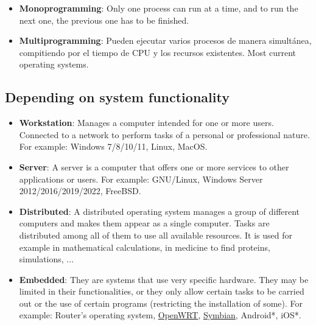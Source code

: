 \begin{itemize}
    \item \textbf{Monoprogramming}: Only one process can run at a time, and to run the next one, the previous one has to be finished. \hyperlink{1st_generation operating systems}{}

    \item \textbf{Multiprogramming}: Pueden ejecutar varios procesos de manera simultánea, compitiendo por el tiempo de CPU y los recursos existentes. Most current operating systems.
\end{itemize}


\subsection{Depending on system functionality}

\begin{itemize}
    \item \textbf{Workstation}: Manages a computer intended for one or more users. Connected to a network to perform tasks of a personal or professional nature. For example: Windows 7/8/10/11, Linux, MacOS.

    \item \textbf{Server}: A server is a computer that offers one or more services to other applications or users. For example: GNU/Linux, Windows Server 2012/2016/2019/2022, FreeBSD.

    \item \textbf{Distributed}: A distributed operating system manages a group of different computers and makes them appear as a single computer. Tasks are distributed among all of them to use all available resources. It is used for example in mathematical calculations, in medicine to find proteins, simulations, ...

    \item \textbf{Embedded}: They are systems that use very specific hardware. They may be limited in their functionalities, or they only allow certain tasks to be carried out or the use of certain programs (restricting the installation of some). For example: Router's operating system, \href{https://en.wikipedia.org/wiki/OpenWrt}{OpenWRT}, \href{https://en.wikipedia.org/wiki/Symbian}{Symbian}, Android*, iOS*.
\end{itemize}



